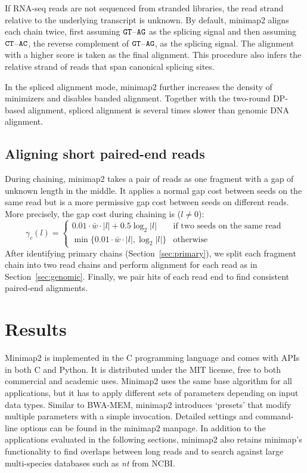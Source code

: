 \documentclass{bioinfo}
\begin{document}
\begin{methods}
If RNA-seq reads are not sequenced from stranded libraries, the read strand
relative to the underlying transcript is unknown. By default, minimap2 aligns
each chain twice, first assuming ${\tt GT}$--${\tt AG}$ as the splicing signal
and then assuming ${\tt CT}$--${\tt AC}$, the reverse complement of ${\tt
GT}$--${\tt AG}$, as the splicing signal. The alignment with a higher score is
taken as the final alignment. This procedure also infers the relative strand of
reads that span canonical splicing sites.

In the spliced alignment mode, minimap2 further increases the density of
minimizers and disables banded alignment. Together with the two-round DP-based
alignment, spliced alignment is several times slower than genomic DNA
alignment.

\subsection{Aligning short paired-end reads}

During chaining, minimap2 takes a pair of reads as one fragment with a gap of
unknown length in the middle. It applies a normal gap cost between seeds on the
same read but is a more permissive gap cost between seeds on different reads.
More precisely, the gap cost during chaining is ($l\not=0$):
\[
\gamma_c(l)=\left\{\begin{array}{ll}
0.01\cdot\bar{w}\cdot |l|+0.5\log_2 |l| & \mbox{if two seeds on the same read} \\
\min\{0.01\cdot\bar{w}\cdot|l|,\log_2|l|\} & \mbox{otherwise}
\end{array}\right.
\]
After identifying primary chains (Section~\ref{sec:primary}), we split each
fragment chain into two read chains and perform alignment for each read as in
Section~\ref{sec:genomic}.  Finally, we pair hits of each read end to find
consistent paired-end alignments.

\end{methods}

\section{Results}

Minimap2 is implemented in the C programming language and comes with APIs in
both C and Python. It is distributed under the MIT license, free to both
commercial and academic uses. Minimap2 uses the same base algorithm for all
applications, but it has to apply different sets of parameters depending on
input data types. Similar to BWA-MEM, minimap2 introduces `presets' that
modify multiple parameters with a simple invocation. Detailed settings
and command-line options can be found in the minimap2 manpage. In addition to
the applications evaluated in the following sections, minimap2 also retains
minimap's functionality to find overlaps between long reads and to search
against large multi-species databases such as \emph{nt} from NCBI.
\end{document}
